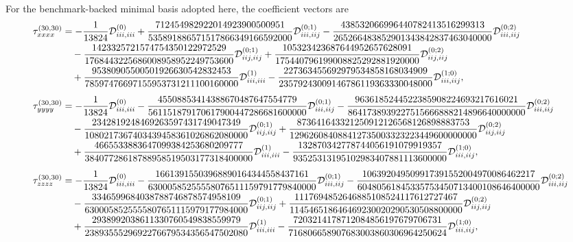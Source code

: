 \documentclass[11pt]{article}
\begin{document}
For the benchmark-backed minimal basis adopted here, the coefficient vectors are
\begin{align}
\tau^{(30,30)}_{xxxx} &= -\frac{1}{13824} \mathcal{D}^{(0)}_{iii,iii}
+ \frac{712454982922014923900500951}{535891886571517866349166592000} \mathcal{D}^{(0;1)}_{iii,iij}
- \frac{438532066996440782413516299313}{265266483852901343842837463040000} \mathcal{D}^{(0;2)}_{iii,iij} \notag\\
&\quad
- \frac{1423325721574754350122972529}{1768443225686008958952249753600} \mathcal{D}^{(0;1)}_{iij,iij}
+ \frac{105323423687644952657628091}{175440796199008825292881920000} \mathcal{D}^{(0;2)}_{iij,iij} \notag\\
&\quad
+ \frac{95380905500501926630542832453}{78597476697155953731211100160000} \mathcal{D}^{(1)}_{iii,iii}
- \frac{227363455692979534858168034909}{23579243009146786119363330048000} \mathcal{D}^{(1;0)}_{iii,iij},
\\[0.6em]
\tau^{(30,30)}_{yyyy} &= -\frac{1}{13824} \mathcal{D}^{(0)}_{iii,iii}
- \frac{45508853414388670487647554779}{561151879170617900447286681600000} \mathcal{D}^{(0;1)}_{iii,iij}
- \frac{9636185244522385908224693217616021}{8641738939227515666888214896640000000} \mathcal{D}^{(0;2)}_{iii,iij} \notag\\
&\quad
- \frac{2342819248469263597431749047349}{1080217367403439458361026862080000} \mathcal{D}^{(0;1)}_{iij,iij}
+ \frac{873641643321250912126568126898883753}{129626084088412735003323223449600000000} \mathcal{D}^{(0;2)}_{iij,iij} \notag\\
&\quad
+ \frac{4665533883647099384253680209777}{38407728618788958519503177318400000} \mathcal{D}^{(1)}_{iii,iii}
- \frac{132870342778744056191079919357}{93525313195102983407881113600000} \mathcal{D}^{(1;0)}_{iii,iij},
\\[0.6em]
\tau^{(30,30)}_{zzzz} &= -\frac{1}{13824} \mathcal{D}^{(0)}_{iii,iii}
- \frac{16613915503968890164344558437161}{63000585255558076511159791779840000} \mathcal{D}^{(0;1)}_{iii,iij}
- \frac{106392049509917391552004970086462217}{60480561845335753450713400108646400000} \mathcal{D}^{(0;2)}_{iii,iij} \notag\\
&\quad
- \frac{3346599684038788746878574958109}{6300058525555807651115979177984000} \mathcal{D}^{(0;1)}_{iij,iij}
+ \frac{1117694852646885108524117612727467}{114546518646469230020290530508800000} \mathcal{D}^{(0;2)}_{iij,iij} \notag\\
&\quad
+ \frac{2938992038611330760549838559979}{2389355529692276679534356547502080} \mathcal{D}^{(1)}_{iii,iii}
- \frac{7203214178712084856197679706731}{716806658907683003860306964250624} \mathcal{D}^{(1;0)}_{iii,iij},

\end{align}
\end{document}
